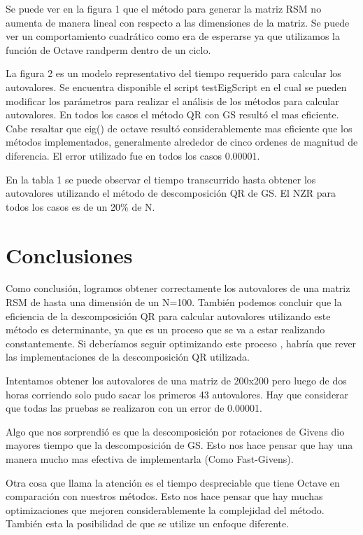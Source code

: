 \documentclass[a4paper,10pt,spanish]{article}
\begin{document}
Se puede ver en la figura 1 que el método para generar la matriz RSM no aumenta de manera lineal con respecto a las dimensiones de la matriz. Se puede ver un comportamiento cuadrático como era de esperarse ya que utilizamos la función de Octave randperm dentro de un ciclo.


La figura 2 es un modelo representativo del tiempo requerido para calcular los autovalores. Se encuentra disponible el script testEigScript en el cual se pueden modificar los parámetros para realizar el análisis de los métodos para calcular autovalores. En todos los casos el método QR con GS resultó el mas eficiente. Cabe resaltar que eig() de octave resultó considerablemente mas eficiente que los métodos implementados, generalmente alrededor de cinco ordenes de magnitud de diferencia. El error utilizado fue en todos los casos 0.00001.

En la tabla 1 se puede observar el tiempo transcurrido hasta obtener los autovalores utilizando el método de descomposición QR de GS. El NZR para todos los casos es de un 20\% de N.

\pagebreak

\section{Conclusiones}
Como conclusión, logramos obtener correctamente los autovalores de una matriz RSM de hasta una dimensión de un N=100. También podemos concluir que la eficiencia de la descomposición QR para calcular autovalores utilizando este método es determinante, ya que es un proceso que se va a estar realizando constantemente. Si deberíamos seguir optimizando este proceso , habría que rever las implementaciones de la descomposición QR utilizada.

Intentamos obtener los autovalores de una matriz de 200x200 pero luego de dos horas corriendo solo pudo sacar los primeros 43 autovalores. Hay que considerar que todas las pruebas se realizaron con un error de 0.00001.

Algo que nos sorprendió es que la descomposición por rotaciones de Givens dio mayores tiempo que la descomposición de GS. Esto nos hace pensar que hay una manera mucho mas efectiva de implementarla (Como Fast-Givens).

Otra cosa que llama la atención es el tiempo despreciable que tiene Octave en comparación con nuestros métodos. Esto nos hace pensar que hay muchas optimizaciones que mejoren considerablemente la complejidad del método. También esta la posibilidad de que se utilize un enfoque diferente.
\end{document}

